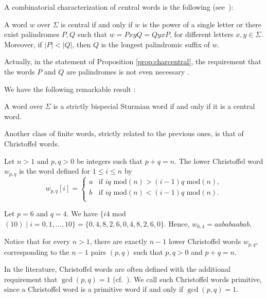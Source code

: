 \documentclass{llncs}
\begin{document}
A combinatorial characterization of central words is the following (see~\cite{Del97}):

\begin{proposition}\label{prop:charcentral}
A word $w$ over $\Sigma$ is central if and only if $w$ is the power of a single letter or there exist palindromes $P,Q$ such that $w=PxyQ=QyxP$, for different letters $x,y\in \Sigma$. Moreover, if $|P|<|Q|$, then $Q$ is the longest palindromic suffix of $w$.
\end{proposition}

Actually, in the statement of Proposition \ref{prop:charcentral}, the requirement that the words $P$ and $Q$  are palindromes is not even necessary \cite{CarDel05}.

We have the following remarkable result \cite{DelMi94}:

\begin{proposition}\label{prop:sbscen}
A word over $\Sigma$ is a strictly bispecial Sturmian word if and only if it is a central word.
\end{proposition}

Another class of finite words, strictly related to the previous ones, is that of Christoffel words.

\begin{definition}
Let $n>1$ and $p,q>0$ be integers such that $p+q=n$. The lower Christoffel word $w_{p,q}$ is the word defined for $1\le i\le n$ by
\[w_{p,q}[i] = \left\{ \begin{array}{lllll}
a & \mbox{if $iq$ mod$(n)>(i-1)q$ mod$(n)$,}\\
b & \mbox{if $iq$ mod$(n)<(i-1)q$ mod$(n)$.}\\
\end{array} \right.\]
\end{definition}

\begin{example}
 Let $p=6$ and $q=4$. We have $\{i4$ mod$(10)\mid i=0,1,\ldots,10\}=\{0,4,8,2,6,0,4,8,2,6,0\}$. Hence, $w_{6,4}=aababaabab$.
\end{example}

Notice that for every $n>1$, there are exactly $n-1$ lower Christoffel words $w_{p,q}$, corresponding to the $n-1$ pairs $(p,q)$ such that $p,q>0$ and $p+q=n$. 

\begin{remark}
In the literature, Christoffel words are often defined with the additional requirement that $\gcd(p,q)=1$ (cf.~\cite{Book08}). We call such Christoffel words primitive, since a Christoffel word is a primitive word if and only if $\gcd(p,q)=1$.
\end{remark}
\end{document}
